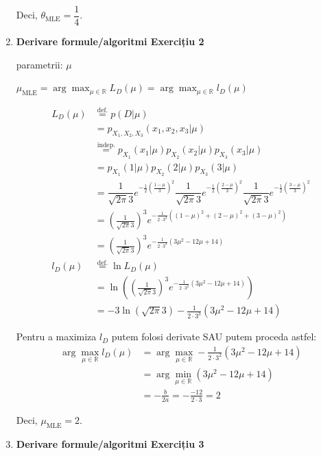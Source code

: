 \documentclass[12pt]{article}
\begin{document}
\begin{enumerate}
		Deci, $\theta_\text{MLE} = \dfrac{1}{4}$.
		
		\newpage
		
		\item \textbf{Derivare formule/algoritmi Exercițiu 2}
		
		parametrii: $\mu$

		$\mu_\text{MLE} = \arg \max_{\mu \in \mathbb{R}} L_D(\mu) = \arg \max_{\mu \in \mathbb{R}} l_D(\mu)$
		
		\begin{align*}
		L_D(\mu) &\stackrel{\text{def.}}{=} p(D|\mu)\\
		&=p_{X_1,X_2,X_3}(x_1,x_2,x_3|\mu)\\
		&\stackrel{\text{indep.}}{=}p_{X_1}(x_1|\mu) p_{X_2}(x_2|\mu) p_{X_3}(x_3|\mu)\\
		&=p_{X_1}(1|\mu) p_{X_2}(2|\mu) p_{X_3}(3|\mu)\\
		&=\dfrac{1}{\sqrt{2\pi} 3} e^{-\frac{1}{2}\left(\frac{1-\mu}{3}\right)^2}  \dfrac{1}{\sqrt{2\pi} 3} e^{-\frac{1}{2}\left(\frac{2-\mu}{3}\right)^2} \dfrac{1}{\sqrt{2\pi} 3} e^{-\frac{1}{2}\left(\frac{3-\mu}{3}\right)^2}\\
		&=\left(\frac{1}{\sqrt{2\pi}3}\right)^3 e^{-\frac{1}{2\cdot 3^2} ((1-\mu)^2 + (2-\mu)^2 + (3-\mu)^2) }\\
		&=\left(\frac{1}{\sqrt{2\pi}3}\right)^3 e^{-\frac{1}{2\cdot 3^2} (3\mu^2 - 12\mu + 14) }\\
		l_D(\mu) &\stackrel{\text{def.}}{=} \ln L_D(\mu)\\
		&=\ln\left( \left(\frac{1}{\sqrt{2\pi}3}\right)^3 e^{-\frac{1}{2\cdot 3^2} (3\mu^2 - 12\mu + 14) }\right)\\
		&=-3\ln(\sqrt{2 \pi} 3) - \frac{1}{2\cdot 3^3} (3\mu^2 - 12 \mu + 14)
		\end{align*}
		
		Pentru a maximiza $l_D$ putem folosi derivate SAU putem proceda astfel:
		\begin{align*}
		\arg \max_{\mu \in \mathbb{R}} l_D(\mu) &= \arg \max_{\mu \in \mathbb{R}} -\frac{1}{2 \cdot 3^2}(3\mu^2 - 12 \mu + 14) \\
		&= \arg \min_{\mu \in \mathbb{R}}(3\mu^2 - 12 \mu + 14)\\
		&=-\frac{b}{2a} = -\frac{-12}{2\cdot 3}=2
		\end{align*}
		
		Deci, $\mu_\text{MLE} = 2$.
		
		\newpage
		
		\item \textbf{Derivare formule/algoritmi Exercițiu 3}
		

\end{enumerate}
\end{document}
